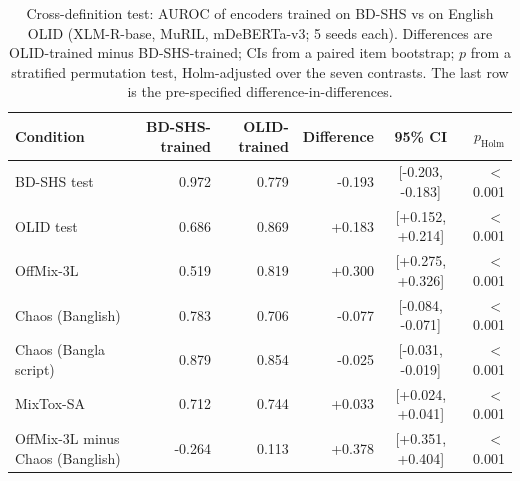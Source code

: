 \begin{table}[t]
\centering
\small
\setlength{\tabcolsep}{3pt}
\caption{Cross-definition test: AUROC of encoders trained on BD-SHS vs on English OLID (XLM-R-base, MuRIL, mDeBERTa-v3; 5 seeds each). Differences are OLID-trained minus BD-SHS-trained; CIs from a paired item bootstrap; $p$ from a stratified permutation test, Holm-adjusted over the seven contrasts. The last row is the pre-specified difference-in-differences.}
\label{tab:cross-definition-contrasts}
\begin{tabular}{lrrrcr}
\toprule
Condition & BD-SHS-trained & OLID-trained & Difference & 95\% CI & $p_{\mathrm{Holm}}$ \\
\midrule
BD-SHS test & 0.972 & 0.779 & -0.193 & [-0.203, -0.183] & $<$0.001 \\
OLID test & 0.686 & 0.869 & +0.183 & [+0.152, +0.214] & $<$0.001 \\
OffMix-3L & 0.519 & 0.819 & +0.300 & [+0.275, +0.326] & $<$0.001 \\
Chaos (Banglish) & 0.783 & 0.706 & -0.077 & [-0.084, -0.071] & $<$0.001 \\
Chaos (Bangla script) & 0.879 & 0.854 & -0.025 & [-0.031, -0.019] & $<$0.001 \\
MixTox-SA & 0.712 & 0.744 & +0.033 & [+0.024, +0.041] & $<$0.001 \\
OffMix-3L minus Chaos (Banglish) & -0.264 & 0.113 & +0.378 & [+0.351, +0.404] & $<$0.001 \\
\bottomrule
\end{tabular}
\end{table}
